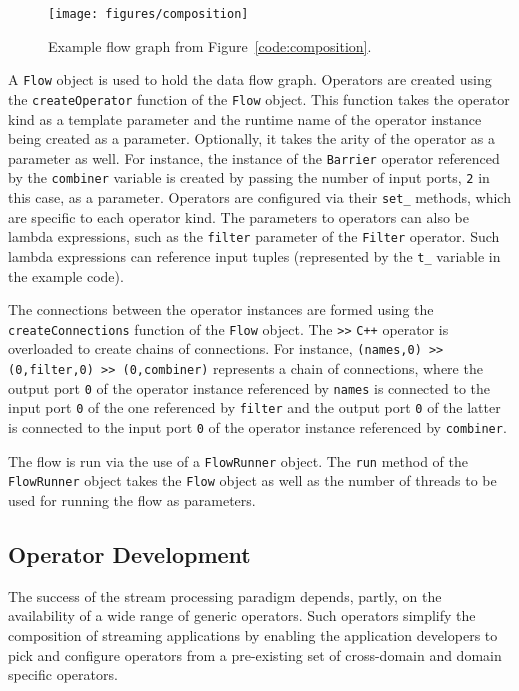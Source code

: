 \begin{figure}
\centering
\texttt{[image: figures/composition]}
\caption{Example flow graph from Figure~\ref{code:composition}.}
\label{fig:composition}
\end{figure}

A \texttt{Flow} object is used to hold the data flow graph. Operators are
created using the \texttt{createOperator} function of the \texttt{Flow}
object. This function takes the operator kind as a template parameter and the
runtime name of the operator instance being created as a parameter.
Optionally, it takes the arity of the operator as a parameter as well. For
instance, the instance of the
\texttt{Barrier} operator referenced by the \texttt{combiner} variable is
created by passing the number of input ports, \texttt{2} in this case, as a
parameter. Operators are configured via their \texttt{set\_} methods, which are
specific to each operator kind. The parameters to operators can also be lambda
expressions, such as the \texttt{filter} parameter of the \texttt{Filter}
operator. Such lambda expressions can reference input tuples (represented by
the \texttt{t\_} variable in the example code).

The connections between the operator instances are formed using the
\texttt{createConnections} function of the \texttt{Flow} object. The
\texttt{>>}
\verb!C++! operator is overloaded to create chains of connections. For
instance, \texttt{(names,0) >> (0,filter,0) >> (0,combiner)} represents a
chain of connections, where the output port \texttt{0} of the operator
instance referenced by \texttt{names} is connected to the input port
\texttt{0} of the one referenced by \texttt{filter} and the output port
\texttt{0} of the latter is connected to the input port \texttt{0} of the
operator instance referenced by \texttt{combiner}.

The flow is run via the use of a \texttt{FlowRunner} object. The \texttt{run}
method of the \texttt{FlowRunner} object takes the \texttt{Flow} object as
well as the number of threads to be used for running the flow as parameters.

\subsection{Operator Development}
The success of the stream processing paradigm depends, partly, on the
availability of a wide range of generic operators. Such operators simplify the
composition of streaming applications by enabling the application developers
to pick and configure operators from a pre-existing set of cross-domain and
domain specific operators.

